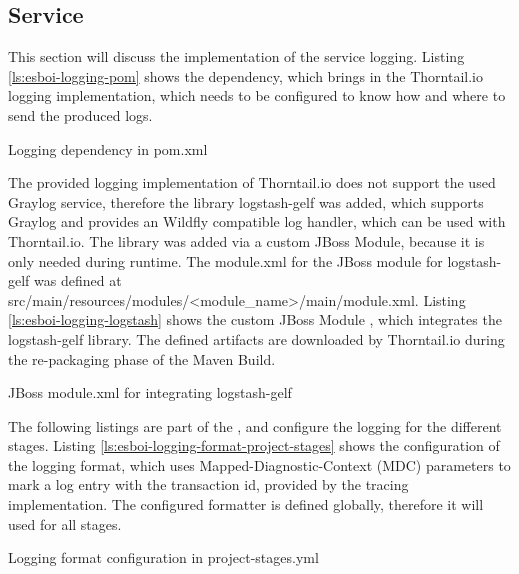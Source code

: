 \subsection{Service}
\label{sec:esbi-logging-service}
This section will discuss the implementation of the service logging. Listing \vref{ls:esboi-logging-pom} shows the dependency, which brings in the Thorntail.io logging implementation, which needs to be configured to know how and where to send the produced logs.

\begin{listing}[h]
	\caption{Logging dependency in pom.xml}
	\label{ls:esboi-logging-pom}
\end{listing}

The provided logging implementation of Thorntail.io does not support the used Graylog service, therefore the library logstash-gelf was added, which supports Graylog and provides an Wildfly compatible log handler, which can be used with Thorntail.io. The library was added via a custom JBoss Module, because it is only needed during runtime. The module.xml for the JBoss module for logstash-gelf was defined at src/main/resources/modules/<module\_name>/main/module.xml. Listing \vref{ls:esboi-logging-logstash} shows the custom JBoss Module , which integrates the logstash-gelf library. The defined artifacts are downloaded by Thorntail.io during the re-packaging phase of the Maven Build\cite{LogstashGelf2018}.
\newpage

\begin{listing}[h]
	\caption{JBoss module.xml for integrating logstash-gelf}
	\label{ls:esboi-logging-logstash}
\end{listing}

The following listings are part of the , and configure the logging for the different stages. Listing \vref{ls:esboi-logging-format-project-stages} shows the configuration of the logging format, which uses Mapped-Diagnostic-Context (MDC) parameters to mark a log entry with the transaction id, provided by the tracing implementation. The configured formatter is defined globally, therefore it will used for all stages.

\begin{listing}[h]
	\caption{Logging format configuration in project-stages.yml}
	\label{ls:esboi-logging-format-project-stages}
\end{listing}

